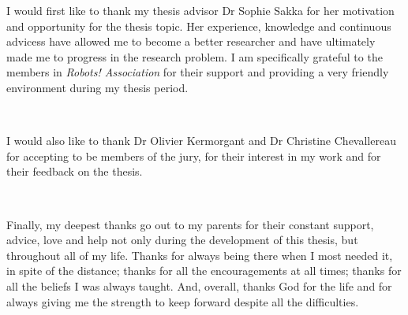 \documentclass{thesisreport}
\begin{document}
 I would first like to thank my thesis advisor Dr Sophie Sakka for her motivation and opportunity for the thesis topic.
 Her experience, knowledge and continuous advicess have allowed me to become a better researcher and have ultimately made 
 me to progress in the research problem. I am specifically grateful to the members in \textit{Robots! Association} for their support and providing 
 a very friendly environment during my thesis period. 

 ~
 
I would also like to thank Dr Olivier Kermorgant and Dr Christine Chevallereau for accepting to be members of the jury, for their 
interest in my work and for their feedback on the thesis.

~

Finally, my deepest thanks go out to my parents for their constant support, advice, love and help not only during the development 
of this thesis, but throughout all of my life. Thanks for always being there when I most needed it, in spite of the distance; thanks
for all the encouragements at all times; thanks for all the beliefs I was always taught. And, overall, thanks God for the life and 
for always giving me the strength to keep forward despite all the difficulties.

\newpage
 
 
\end{document}
